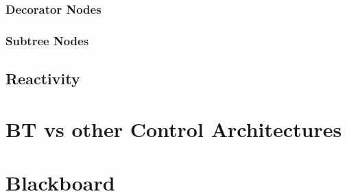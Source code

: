 \subsubsection{Decorator Nodes}

\subsubsection{Subtree Nodes}

\subsection{Reactivity}

\section{BT vs other Control Architectures}

\section{Blackboard}

\cite{BlackboardDesignPattern}
